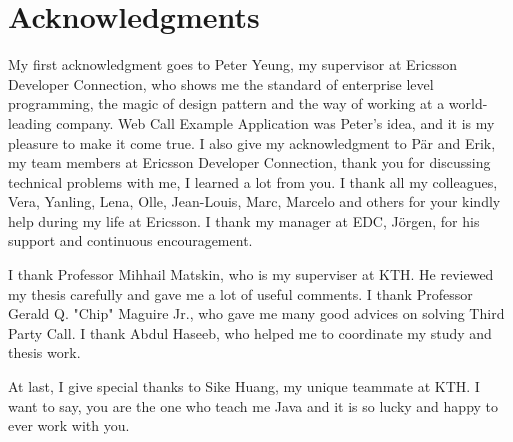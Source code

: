 \chapter*{Acknowledgments}

My first acknowledgment goes to Peter Yeung, my supervisor at Ericsson Developer Connection, who shows me the standard of enterprise level programming, the magic of design pattern and the way of working at a world-leading company. Web Call Example Application was Peter's idea, and it is my pleasure to make it come true. I also give my acknowledgment to P\"{a}r and Erik, my team members at Ericsson Developer Connection, thank you for discussing technical problems with me, I learned a lot from you. I thank all my colleagues, Vera, Yanling, Lena, Olle, Jean-Louis, Marc, Marcelo and others for your kindly help during my life at Ericsson. I thank my manager at EDC, J\"{o}rgen, for his support and continuous encouragement.

I thank Professor Mihhail Matskin, who is my superviser at KTH. He reviewed my thesis carefully and gave me a lot of useful comments. I thank Professor Gerald Q. "Chip" Maguire Jr., who gave me many good advices on solving Third Party Call. I thank Abdul Haseeb, who helped me to coordinate my study and thesis work.

At last, I give special thanks to Sike Huang, my unique teammate at KTH. I want to say, you are the one who teach me Java and it is so lucky and happy to ever work with you.

